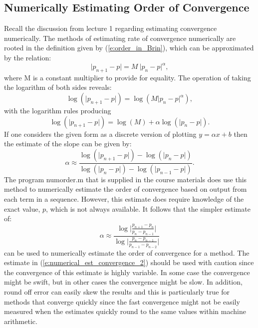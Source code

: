 \documentclass[twoside]{article}
\def\ds{\displaystyle}
\begin{document}
\subsection{Numerically Estimating Order of Convergence}
Recall the discussion from lecture 1 regarding estimating convergence numerically. The methods of estimating rate of convergence numerically are rooted in the definition given by (\ref{e:order_in_Brin}), which can be approximated by the relation:
$$  {\vert p_{n+1}-p\vert} = M \ {\vert p_n-p\vert^{\alpha}}, $$
where M is a constant multiplier to provide for equality. The operation of taking the logarithm of both sides reveals:
$$  \log ({\vert p_{n+1}-p\vert}) = \log (M {\vert p_n-p\vert^{\alpha}}), $$
with the logarithm rules producing
$$  \log ({\vert p_{n+1}-p\vert}) = \log (M) + \alpha \log( {\vert p_n-p\vert}). $$
If one considers the given form as a discrete version of plotting $\ds y = \alpha x + b$ then the estimate of the slope can be given by:
$$\alpha \approx \frac {\log (\vert p_{n+1}-p \vert) - \log( \vert p_n - p \vert)}{\log ( \vert p_n - p \vert)-\log ( \vert p_{n-1}-p\vert )}.$$
The program numorder.m that is supplied in the course materials does use this method to numerically estimate the order of convergence based on output from each term in a sequence. However, this estimate does require knowledge of the exact value, $p$, which is not always available. It follows that the simpler estimate of:
\begin{equation}
\alpha \approx \frac {\log \vert \frac {p_{n+1} - p_n} {p_n - p_{n-1} } \vert}{\log \vert \frac {p_n - p_{n-1}}{p_{n-1} - p_{n-2}}\vert}
\label{e:numerical_est_convergence_2}
\end{equation}
can be used to numerically estimate the order of convergence for a method. The estimate in (\ref{e:numerical_est_convergence_2}) should be used with caution since the convergence of this estimate is highly variable. In some case the convergence might be swift, but in other cases the convergence might be slow. In addition, round off error can easily skew the results and this is particularly true for methods that converge quickly since the fast convergence might not be easily measured when the estimates quickly round to the same values within machine arithmetic. 
\end{document}
